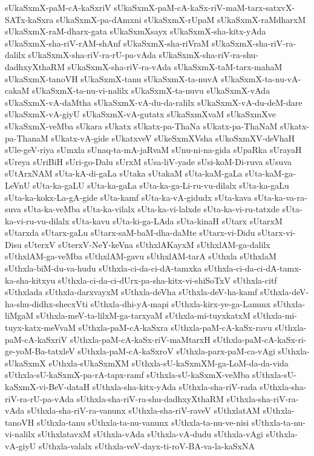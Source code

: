 {sUkaSxmX-paM-cA-kaSxriV
sUkaSxmX-paM-cA-kaSx-riV-maM-tarx-satxvX-SATx-kaSxra
sUkaSxmX-pa-dAmxni
sUkaSxmX-rUpaM
sUkaSxmX-raMdharxM
sUkaSxmX-raM-dharx-gata
sUkaSxmXsayx
sUkaSxmX-sha-kitx-yAda
sUkaSxmX-sha-riV-rAM-shAnf
sUkaSxmX-sha-riVraM
sUkaSxmX-sha-riV-ra-dalilx
sUkaSxmX-sha-riV-ra-rU-pa-vAda
sUkaSxmX-sha-riV-ra-shu-dadhxyXthaRM
sUkaSxmX-sha-riV-ra-vAda
sUkaSxmX-taM-tarx-mahaM
sUkaSxmX-tanoVH
sUkaSxmX-tanu
sUkaSxmX-ta-nuvA
sUkaSxmX-ta-nu-vA-cakaM
sUkaSxmX-ta-nu-vi-nalilx
sUkaSxmX-ta-nuvu
sUkaSxmX-vAda
sUkaSxmX-vA-daMtha
sUkaSxmX-vA-du-da-ralilx
sUkaSxmX-vA-du-deM-dare
sUkaSxmX-vA-giyU
sUkaSxmX-vA-gutatx
sUkaSxmXvaM
sUkaSxmXve
sUkaSxmX-veMba
sUkara
sUkatx
sUkatx-pa-ThaNa
sUkatx-pa-ThaNaM
sUkatx-pa-ThanaM
sUkatx-vA-gide
sUkatxveV
sUkeSxmXVsha
sUkoSxmXV-deVhaH
sUle-geV-riya
sUmxla
sUnaq-ta-mA-jaRvaM
sUnu-ni-na-gida
sUpaRka
sUrayaH
sUreya
sUriBiH
sUri-go-Dalu
sUrxM
sUsa-liV-yade
sUsi-koM-Di-ruva
sUsuva
sUtArxNAM
sUta-kA-di-gaLa
sUtaka
sUtakaM
sUta-kaM-gaLa
sUta-kaM-ga-LeVnU
sUta-ka-gaLU
sUta-ka-gaLa
sUta-ka-ga-Li-ru-vu-dilalx
sUta-ka-gaLu
sUta-ka-kokx-La-gA-gide
sUta-kamf
sUta-ka-vA-gidudx
sUta-kava
sUta-ka-va-ra-suva
sUta-ka-veMba
sUta-ka-vilalx
sUta-ka-vi-lalxde
sUta-ka-vi-ru-tatxde
sUta-ka-vi-ru-vu-dilalx
sUta-kavu
sUta-ki-ga-LAda
sUta-kinaH
sUtarx
sUtarxM
sUtarxda
sUtarx-gaLu
sUtarx-saM-baM-dha-daMte
sUtarx-vi-Didu
sUtarx-vi-Disu
sUterxV
sUterxV-NeY-keVna
sUthxlAKayxM
sUthxlAM-ga-dalilx
sUthxlAM-ga-veMba
sUthxlAM-gavu
sUthxlAM-tarA
sUthxla
sUthxlaM
sUthxla-biM-du-va-hudu
sUthxla-ci-da-ci-dA-tamxka
sUthxla-ci-da-ci-dA-tamx-ka-sha-kitxyu
sUthxla-ci-da-ci-dUrx-pa-sha-kitx-vi-shiSoTxV
sUthxla-citf
sUthxlada
sUthxla-darxvayxM
sUthxla-deVha
sUthxla-deV-ha-kamf
sUthxla-deV-ha-shu-didhx-shecxVti
sUthxla-dhi-yA-mapi
sUthxla-kirx-ye-ga-Lanunx
sUthxla-liMgaM
sUthxla-meV-ta-lilxM-ga-tarxyaM
sUthxla-mi-tuyxkatxM
sUthxla-mi-tuyx-katx-meVvaM
sUthxla-paM-cA-kaSxra
sUthxla-paM-cA-kaSx-ravu
sUthxla-paM-cA-kaSxriV
sUthxla-paM-cA-kaSx-riV-maMtarxH
sUthxla-paM-cA-kaSx-ri-ge-yoM-Ba-tatxleV
sUthxla-paM-cA-kaSxroV
sUthxla-parx-paM-ca-vAgi
sUthxla-sUkaSxmX
sUthxla-sUkaSxmXM
sUthxla-sU-kaSxmXM-ga-LoM-da-da-vida
sUthxla-sU-kaSxmX-pa-rA-tapx-ramf
sUthxla-sU-kaSxmX-veMba
sUthxla-sU-kaSxmX-vi-BeV-dataH
sUthxla-sha-kitx-yAda
sUthxla-sha-riV-rada
sUthxla-sha-riV-ra-rU-pa-vAda
sUthxla-sha-riV-ra-shu-dadhxyXthaRM
sUthxla-sha-riV-ra-vAda
sUthxla-sha-riV-ra-vanunx
sUthxla-sha-riV-raveV
sUthxlatAM
sUthxla-tanoVH
sUthxla-tanu
sUthxla-ta-nu-vanunx
sUthxla-ta-nu-ve-nisi
sUthxla-ta-nu-vi-nalilx
sUthxlatavxM
sUthxla-vAda
sUthxla-vA-dudu
sUthxla-vAgi
sUthxla-vA-giyU
sUthxla-valalx
sUthxla-veV-dayx-ti-roV-BA-va-la-kaSxNA
}
